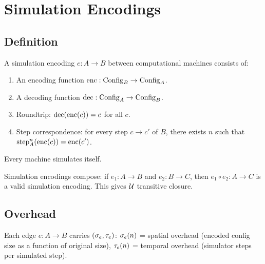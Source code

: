 \chapter{Simulation Encodings}\label{ch:encodings}

\section{Definition}

\begin{definition}\label{simulation-def}
\leanok
{}
A simulation encoding $e : A \to B$ between computational machines consists of:
\begin{enumerate}
\item An encoding function $\mathrm{enc} : \mathrm{Config}_B \to \mathrm{Config}_A$.
\item A decoding function $\mathrm{dec} : \mathrm{Config}_A \to \mathrm{Config}_B$.
\item Roundtrip: $\mathrm{dec}(\mathrm{enc}(c)) = c$ for all $c$.
\item Step correspondence: for every step $c \to c'$ of $B$, there exists $n$
  such that $\mathrm{step}_A^n(\mathrm{enc}(c)) = \mathrm{enc}(c')$.
\end{enumerate}
\end{definition}

\begin{proposition}\label{sim-id}
\leanok
{}
Every machine simulates itself.
\end{proposition}

\begin{proposition}[Composition]\label{sim-compose}
\leanok
{}
Simulation encodings compose: if $e_1 : A \to B$ and $e_2 : B \to C$, then
$e_1 \circ e_2 : A \to C$ is a valid simulation encoding. This gives $\mathcal{U}$
transitive closure.
\end{proposition}

\section{Overhead}

\begin{definition}[Overhead]\label{overhead-def}
\leanok
{}
Each edge $e : A \to B$ carries $(\sigma_e, \tau_e)$:
$\sigma_e(n)$ = spatial overhead (encoded config size as a function of
original size), $\tau_e(n)$ = temporal overhead (simulator steps per
simulated step).
\end{definition}

